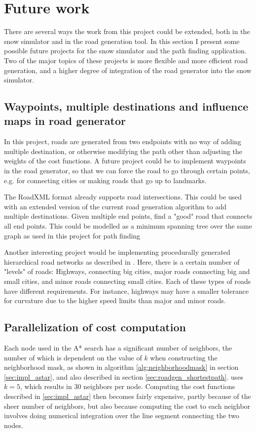 \chapter{Future work}
\label{chap:futurework}
There are several ways the work from this project could be extended, both in the snow simulator and in the road generation tool. In this section I present some possible future projects for the snow simulator and the path finding application. Two of the major topics of these projects is more flexible and more efficient road generation, and a higher degree of integration of the road generator into the snow simulator.

\section{Waypoints, multiple destinations and influence maps in road generator}
In this project, roads are generated from two endpoints with no way of adding multiple destination, or otherwise modifying the path other than adjusting the weights of the cost functions. A future project could be to implement waypoints in the road generator, so that we can force the road to go through certain points, e.g. for connecting cities or making roads that go up to landmarks. 

The RoadXML format already supports road intersections. This could be used with an extended version of the current road generation algorithm to add multiple destinations. Given multiple end points, find a "good" road that connects all end points. This could be modelled as a minimum spanning tree over the same graph as used in this project for path finding

Another interesting project would be implementing procedurally generated hierarchical road networks as described in \cite{roadgen2}. Here, there is a certain number of "levels" of roads: Highways, connecting big cities, major roads connecting big and small cities, and minor roads connecting small cities. Each of these types of roads have different requirements. For instance, highways may have a smaller tolerance for curvature due to the higher speed limits than major and minor roads. 


\section{Parallelization of cost computation}
\label{sec:future_parallellization}
Each node used in the A* search has a significant number of neighbors, the number of which is dependent on the value of $k$ when constructing the neighborhood mask, as shown in algorithm \ref{alg:neighborhoodmask} in section \ref{sec:impl_astar}, and also described in section \ref{sec:roadgen_shortestpath}. \cite{roadgen} uses $k=5$, which results in 30 neighbors per node. Computing the cost functions described in \ref{sec:impl_astar} then becomes fairly expensive, partly because of the sheer number of neighbors, but also because computing the cost to each neighbor involves doing numerical integration over the line segment connecting the two nodes.

